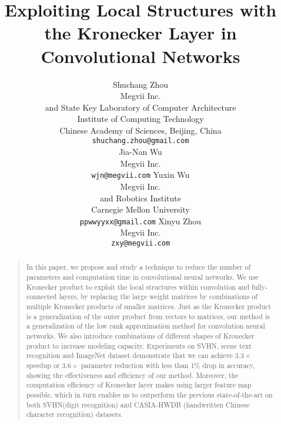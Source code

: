 \documentclass{article}
\begin{document}
\title{Exploiting Local Structures with the Kronecker Layer in Convolutional Networks}
\author{
\name Shuchang Zhou     \\
\addr
Megvii Inc. \\
and State Key Laboratory of Computer Architecture \\
Institute of Computing Technology \\
Chinese Academy of Sciences, Beijing, China\\
\texttt{shuchang.zhou@gmail.com} \\
          \AND
\name Jia-Nan Wu \\
 \addr Megvii Inc. \\
              \texttt{wjn@megvii.com}
\AND
\name Yuxin Wu \\
 \addr Megvii Inc. \\
and Robotics Institute \\
Carnegie Mellon University \\
\texttt{ppwwyyxx@gmail.com}
\AND
\name Xinyu Zhou     \\
\addr Megvii Inc. \\
\texttt{zxy@megvii.com}
}

\maketitle
\begin{abstract}
\begin{quote}
In this paper, we propose and study a technique to reduce the number of parameters and computation time in convolutional neural networks.
We use Kronecker product to exploit the local structures within convolution and fully-connected layers, by replacing the large weight matrices by combinations of multiple Kronecker products of smaller matrices.
Just as the Kronecker product is a generalization of the outer product from vectors to matrices, our method is a generalization of the low rank
approximation method for convolution neural networks. We also introduce combinations of different shapes of Kronecker product to increase modeling capacity.
Experiments on SVHN, scene text recognition and ImageNet dataset demonstrate that we can achieve $3.3 \times$ speedup or $3.6 \times$ parameter reduction with less than 1\% drop in accuracy, showing the effectiveness and efficiency of our method.
Moreover, the computation efficiency of Kronecker layer makes using larger feature map possible, which in turn enables us to outperform the previous state-of-the-art on both SVHN(digit recognition) and CASIA-HWDB (handwritten Chinese character recognition) datasets. %
\end{quote}
\end{abstract}
\end{document}
